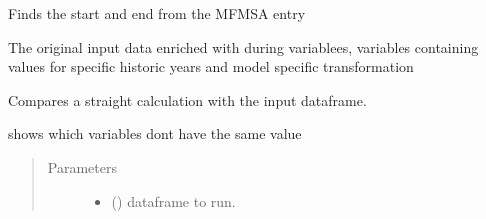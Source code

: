 \documentclass[letterpaper,10pt,english]{sphinxmanual}
\begin{document}
\begin{fulllineitems}
\begin{fulllineitems}
\end{fulllineitems}


\begin{fulllineitems}
\label{\detokenize{index:modelgrabwf2.GrabWfModel.mfmsa_start_end}}
\pysigstartsignatures
{}
\pysigstopsignatures
\sphinxAtStartPar
Finds the start and end from the MFMSA entry

\end{fulllineitems}


\begin{fulllineitems}
\label{\detokenize{index:modelgrabwf2.GrabWfModel.dfmodel}}
\pysigstartsignatures
{}
\pysigstopsignatures
\sphinxAtStartPar
The original input data enriched with during variablees, variables containing
values for specific historic years and model specific transformation

\end{fulllineitems}


\begin{fulllineitems}
\label{\detokenize{index:modelgrabwf2.GrabWfModel.test_model}}
\pysigstartsignatures
{}
\pysigstopsignatures
\sphinxAtStartPar
Compares a straight calculation with the input dataframe.

\sphinxAtStartPar
shows which variables dont have the same value
\begin{quote}\begin{description}
\item[{Parameters}] \leavevmode\begin{itemize}
\item {} 
\sphinxAtStartPar
{} () \textendash{} dataframe to run.


\end{itemize}
\end{description}
\end{quote}
\end{fulllineitems}
\end{fulllineitems}
\end{document}
